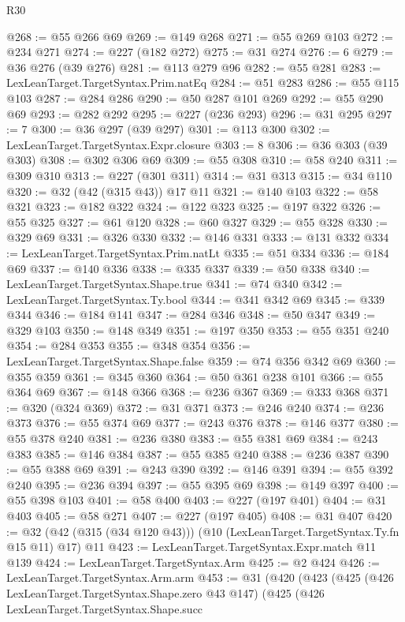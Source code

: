 \begin{lexlean}{R30}
\begin{coremodule}
@268 := @55 @266 @69
@269 := @149 @268
@271 := @55 @269 @103
@272 := @234 @271
@274 := @227 (@182 @272)
@275 := @31 @274
@276 := 6
@279 := @36 @276 (@39 @276)
@281 := @113 @279 @96
@282 := @55 @281
@283 := LexLeanTarget.TargetSyntax.Prim.natEq
@284 := @51 @283
@286 := @55 @115 @103
@287 := @284 @286
@290 := @50 @287 @101 @269
@292 := @55 @290 @69
@293 := @282 @292
@295 := @227 (@236 @293)
@296 := @31 @295
@297 := 7
@300 := @36 @297 (@39 @297)
@301 := @113 @300
@302 := LexLeanTarget.TargetSyntax.Expr.closure
@303 := 8
@306 := @36 @303 (@39 @303)
@308 := @302 @306 @69
@309 := @55 @308
@310 := @58 @240
@311 := @309 @310
@313 := @227 (@301 @311)
@314 := @31 @313
@315 := @34 @110
@320 := @32 (@42 (@315 @43)) @17 @11
@321 := @140 @103
@322 := @58 @321
@323 := @182 @322
@324 := @122 @323
@325 := @197 @322
@326 := @55 @325
@327 := @61 @120
@328 := @60 @327
@329 := @55 @328
@330 := @329 @69
@331 := @326 @330
@332 := @146 @331
@333 := @131 @332
@334 := LexLeanTarget.TargetSyntax.Prim.natLt
@335 := @51 @334
@336 := @184 @69
@337 := @140 @336
@338 := @335 @337
@339 := @50 @338
@340 := LexLeanTarget.TargetSyntax.Shape.true
@341 := @74 @340
@342 := LexLeanTarget.TargetSyntax.Ty.bool
@344 := @341 @342 @69
@345 := @339 @344
@346 := @184 @141
@347 := @284 @346
@348 := @50 @347
@349 := @329 @103
@350 := @148 @349
@351 := @197 @350
@353 := @55 @351 @240
@354 := @284 @353
@355 := @348 @354
@356 := LexLeanTarget.TargetSyntax.Shape.false
@359 := @74 @356 @342 @69
@360 := @355 @359
@361 := @345 @360
@364 := @50 @361 @238 @101
@366 := @55 @364 @69
@367 := @148 @366
@368 := @236 @367
@369 := @333 @368
@371 := @320 (@324 @369)
@372 := @31 @371
@373 := @246 @240
@374 := @236 @373
@376 := @55 @374 @69
@377 := @243 @376
@378 := @146 @377
@380 := @55 @378 @240
@381 := @236 @380
@383 := @55 @381 @69
@384 := @243 @383
@385 := @146 @384
@387 := @55 @385 @240
@388 := @236 @387
@390 := @55 @388 @69
@391 := @243 @390
@392 := @146 @391
@394 := @55 @392 @240
@395 := @236 @394
@397 := @55 @395 @69
@398 := @149 @397
@400 := @55 @398 @103
@401 := @58 @400
@403 := @227 (@197 @401)
@404 := @31 @403
@405 := @58 @271
@407 := @227 (@197 @405)
@408 := @31 @407
@420 := @32 (@42 (@315 (@34 @120 @43))) (@10 (LexLeanTarget.TargetSyntax.Ty.fn @15 @11) @17) @11
@423 := LexLeanTarget.TargetSyntax.Expr.match @11 @139
@424 := LexLeanTarget.TargetSyntax.Arm
@425 := @2 @424
@426 := LexLeanTarget.TargetSyntax.Arm.arm
@453 := @31
    (@420
      (@423
        (@425
          (@426 LexLeanTarget.TargetSyntax.Shape.zero @43 @147)
          (@425
            (@426
              LexLeanTarget.TargetSyntax.Shape.succ

\end{coremodule}
\end{lexlean}
